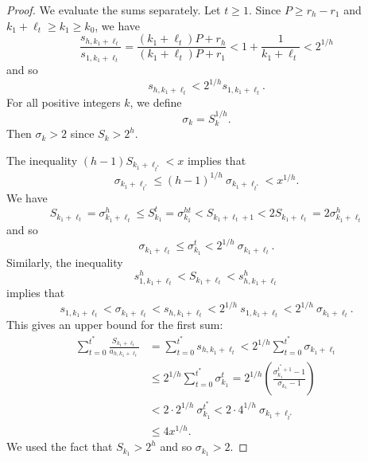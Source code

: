 \documentclass{amsart}
\begin{document}
\begin{proof}
We evaluate the sums separately.  Let $t \geq 1$.  
Since $P \geq r_h - r_1$ and $k_1+\ell_t \geq k_1 \geq k_0$, we have 
\[
\frac{s_{h,{k_1}+\ell_t}}{s_{1,{k_1}+\ell_t}} = \frac{({k_1}+\ell_t)P+r_h}{({k_1}+\ell_t)P+r_1} < 1 + \frac{1}{{k_1}+\ell_t} < 2^{1/h}
\]
and so 
\[
s_{h,{k_1}+\ell_t} < 2^{1/h} s_{1,{k_1}+\ell_t}.
\]
For all positive integers $k$, we define 
\[
\sigma_{k}  = S_k^{1/h}.
\]
Then $\sigma_k > 2$ since $S_k > 2^h$.  

The inequality $(h-1)S_{k_1+\ell_{t^*}} < x$ implies that 
\[
\sigma_{k_1+\ell_{t^*}}  \leq (h-1)^{1/h} \ \sigma_{k_1+\ell_{t^*}} 
< x^{1/h}.
\]
We have 
\[
 S_{k_1+\ell_t} = \sigma_{k_1+\ell_t}^h  \leq S_{k_1}^t = \sigma_{k_1}^{ht} < S_{k_1 + \ell_t + 1} < 2S_{k_1 + \ell_t} = 2\sigma_{k_1 + \ell_t} ^h
\]
and so
\[
\sigma_{k_1+\ell_t} \leq \sigma_{k_1}^t 
< 2^{1/h}\ \sigma_{k_1+\ell_t} .
\]
Similarly, the inequality 
\[
s_{1,{k_1}+\ell_t}^h < S_{{k_1}+\ell_t} < s_{h,{k_1}+\ell_t}^h
\]
implies that
\[
s_{1,{k_1}+\ell_t} < \sigma_{k_1+\ell_t}  < s_{h,{k_1}+\ell_t} 
< 2^{1/h} \ s_{1,{k_1}+\ell_t} < 2^{1/h} \  \sigma_{k_1+\ell_t}.
\]
This gives an upper bound for the first sum: 
\begin{align*}
\sum_{t=0}^{t^*} \frac{S_{k_1+ \ell_t }}{a_{h,{k_1}+\ell_t}}  
& = \sum_{t=0}^{t^*} s_{h,{k_1}+\ell_t}  
<  2^{1/h} \sum_{t=0}^{t^*} \sigma_{k_1+\ell_t} \\
& \leq  2^{1/h}\sum_{t=0}^{t^*} \sigma_{k_1}^t 
= 2^{1/h} \left( \frac{  \sigma_{k_1}^{t^*+1}-1}{\sigma_{k_1} -1} \right) \\
& <  2\cdot 2^{1/h} \ \sigma_{k_1}^{t^*} < 2\cdot 4^{1/h} \ \sigma_{k_1+ \ell_{t^*}} \\
& \leq 4 x^{1/h}.
\end{align*}
We used the fact that $S_{k_1} >  2^h$ and so $\sigma_{k_1} > 2$.


\end{proof}
\end{document}
